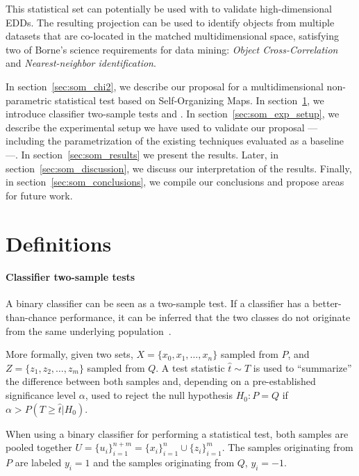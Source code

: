 This statistical set can potentially be used with \PresQ to validate
high-dimensional \glspl{EDD}. The resulting projection can be used to identify objects
from multiple datasets that are co-located in the matched multidimensional space, satisfying
two of Borne's science requirements for data mining: \emph{Object Cross-Correlation} and
\emph{Nearest-neighbor identification}.

In section~\ref{sec:som_chi2}, we describe our proposal
for a multidimensional non-parametric statistical test based on Self-Organizing Maps.
In section~\ref{sec:som_definitions}, we introduce classifier two-sample tests
and .
In section~\ref{sec:som_exp_setup}, we describe the experimental setup we have used
to validate our proposal --- including the parametrization of the existing techniques
evaluated as a baseline ---. In section~\ref{sec:som_results} we present the results.
Later, in section~\ref{sec:som_discussion}, we discuss our interpretation of the results.
Finally, in section~\ref{sec:som_conclusions}, we compile our conclusions and propose areas for future
work.


\section{Definitions}
\label{sec:som_definitions}

\paragraph{Classifier two-sample tests}
\label{sec:som_classifier2sample}
A binary classifier can be seen as a two-sample test. If a classifier has a better-than-chance
performance, it can be inferred that the two classes do not originate from the same underlying
population~\cite{friedman2004multivariate}. 

More formally, given two sets, $X = \{x_0,x_1,\ldots,x_n\}$ sampled from $P$, and \linebreak
$Z = \{z_1,z_2,\ldots,z_m\}$ sampled from $Q$. A test statistic $\hat t \sim T$ is used to
``summarize'' the difference between both samples and, depending on a pre-established
significance level $\alpha$, used to reject the null hypothesis
$H_0: P = Q$ if $\alpha > P(T \ge \hat t | H_0)$.

When using a binary classifier for performing a statistical test, both samples are pooled
together $U = \{u_i\}_{i=1}^{n+m} = \{x_i\}_{i=1}^n \cup \{z_i\}_{i=1}^m$.
The samples originating from $P$ are labeled $y_i=1$ and the samples originating
from $Q$, $y_i=-1$.

